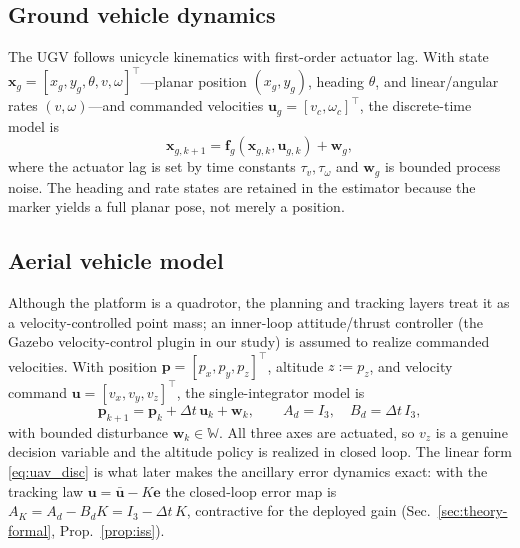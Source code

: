 \subsection{Ground vehicle dynamics}
The UGV follows unicycle kinematics with first-order actuator lag. With state
$\mathbf{x}_g=[x_g,y_g,\theta,v,\omega]^{\!\top}$---planar position $(x_g,y_g)$,
heading $\theta$, and linear/angular rates $(v,\omega)$---and commanded velocities
$\mathbf{u}_g=[v_c,\omega_c]^{\!\top}$, the discrete-time model is
\begin{equation}
\mathbf{x}_{g,k+1}=\mathbf{f}_g(\mathbf{x}_{g,k},\mathbf{u}_{g,k})+\mathbf{w}_g,
\label{eq:ugv}
\end{equation}
where the actuator lag is set by time constants $\tau_v,\tau_\omega$ and
$\mathbf{w}_g$ is bounded process noise. The heading and rate states are retained in
the estimator because the marker yields a full planar pose, not merely a position.

\subsection{Aerial vehicle model}
Although the platform is a quadrotor, the planning and tracking layers treat it as a
velocity-controlled point mass; an inner-loop attitude/thrust controller (the Gazebo
velocity-control plugin in our study) is assumed to realize commanded velocities. With
position $\mathbf{p}=[p_x,p_y,p_z]^{\!\top}$, altitude $z:=p_z$, and velocity command
$\mathbf{u}=[v_x,v_y,v_z]^{\!\top}$, the single-integrator model is
\begin{equation}
\mathbf{p}_{k+1}=\mathbf{p}_k+\Delta t\,\mathbf{u}_k+\mathbf{w}_k,
\qquad A_d=I_3,\quad B_d=\Delta t\,I_3,
\label{eq:uav_disc}
\end{equation}
with bounded disturbance $\mathbf{w}_k\in\mathbb{W}$. All three axes are actuated, so
$v_z$ is a genuine decision variable and the altitude policy is realized in closed
loop. The linear form \eqref{eq:uav_disc} is what later makes the ancillary error
dynamics exact: with the tracking law $\mathbf{u}=\bar{\mathbf{u}}-K\mathbf{e}$ the
closed-loop error map is $A_K=A_d-B_dK=I_3-\Delta t\,K$, contractive for the deployed
gain (Sec.~\ref{sec:theory-formal}, Prop.~\ref{prop:iss}).

